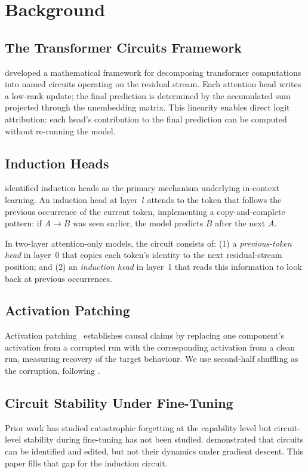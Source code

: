 \section{Background}
\label{sec:background}

\subsection{The Transformer Circuits Framework}
\citet{elhage2021mathematical} developed a mathematical framework for decomposing
transformer computations into named circuits operating on the residual stream.
Each attention head writes a low-rank update; the final prediction is determined by
the accumulated sum projected through the unembedding matrix.
This linearity enables direct logit attribution: each head's contribution to the
final prediction can be computed without re-running the model.

\subsection{Induction Heads}
\citet{olsson2022context} identified induction heads as the primary mechanism
underlying in-context learning.
An induction head at layer~$l$ attends to the token that follows the previous
occurrence of the current token, implementing a copy-and-complete pattern:
if $A \to B$ was seen earlier, the model predicts $B$ after the next $A$.

In two-layer attention-only models, the circuit consists of: (1) a
\emph{previous-token head} in layer~0 that copies each token's identity to the
next residual-stream position; and (2) an \emph{induction head} in layer~1 that
reads this information to look back at previous occurrences.

\subsection{Activation Patching}
Activation patching~\citep{conmy2023automated} establishes causal claims by replacing
one component's activation from a corrupted run with the corresponding activation from
a clean run, measuring recovery of the target behaviour.
We use second-half shuffling as the corruption, following \citet{wang2022interpretability}.

\subsection{Circuit Stability Under Fine-Tuning}
Prior work has studied catastrophic forgetting at the capability level but circuit-level
stability during fine-tuning has not been studied.
\citet{marks2024sparse} demonstrated that circuits can be identified and edited, but not
their dynamics under gradient descent.
This paper fills that gap for the induction circuit.

